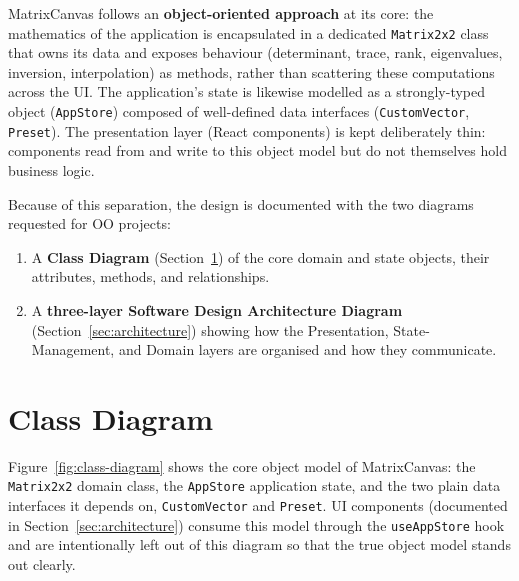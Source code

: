 \documentclass[11pt,a4paper]{article}
\begin{document}
MatrixCanvas follows an \textbf{object-oriented approach} at its core: the
mathematics of the application is encapsulated in a dedicated \texttt{Matrix2x2}
class that owns its data and exposes behaviour (determinant, trace, rank,
eigenvalues, inversion, interpolation) as methods, rather than scattering these
computations across the UI. The application's state is likewise modelled as a
strongly-typed object (\texttt{AppStore}) composed of well-defined data
interfaces (\texttt{CustomVector}, \texttt{Preset}). The presentation layer
(React components) is kept deliberately thin: components read from and write to
this object model but do not themselves hold business logic.

Because of this separation, the design is documented with the two diagrams
requested for OO projects:

\begin{enumerate}
  \item A \textbf{Class Diagram} (Section~\ref{sec:class-diagram}) of the core
        domain and state objects, their attributes, methods, and relationships.
  \item A \textbf{three-layer Software Design Architecture Diagram}
        (Section~\ref{sec:architecture}) showing how the Presentation,
        State-Management, and Domain layers are organised and how they
        communicate.
\end{enumerate}

\section{Class Diagram}
\label{sec:class-diagram}

Figure~\ref{fig:class-diagram} shows the core object model of MatrixCanvas: the
\texttt{Matrix2x2} domain class, the \texttt{AppStore} application state, and
the two plain data interfaces it depends on, \texttt{CustomVector} and
\texttt{Preset}. UI components (documented in Section~\ref{sec:architecture})
consume this model through the \texttt{useAppStore} hook and are intentionally
left out of this diagram so that the true object model stands out clearly.
\end{document}
